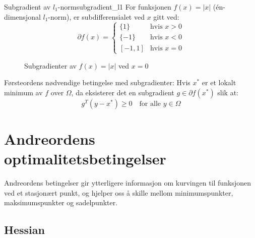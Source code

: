 \begin{example}{Subgradient av $l_1$-norm}{subgradient_l1}
	For funksjonen $f(x) = |x|$ (én-dimensjonal $l_1$-norm), er subdifferensialet ved $x$ gitt ved:
	\[
		\partial f(x) = \begin{cases}
			\{1\}   & \text{hvis } x > 0 \\
			\{-1\}  & \text{hvis } x < 0 \\
			[-1, 1] & \text{hvis } x = 0
		\end{cases}
	\]

	\begin{figure}[H]
		\centering
		\caption{Subgradienter av $f(x) = |x|$ ved $x = 0$}
		\label{fig:subgradient_l1}
	\end{figure}
\end{example}

Førsteordens nødvendige betingelse med subgradienter: Hvis $x^*$ er et lokalt minimum av $f$ over $\Omega$, da eksisterer det en subgradient $g \in \partial f(x^*)$ slik at:
\[
	g^T (y - x^*) \geq 0 \quad \text{for alle } y \in \Omega
\]

\section{Andreordens optimalitetsbetingelser}

Andreordens betingelser gir ytterligere informasjon om kurvingen til funksjonen ved et stasjonært punkt, og hjelper oss å skille mellom minimumspunkter, maksimumspunkter og sadelpunkter.

\subsection{Hessian}

